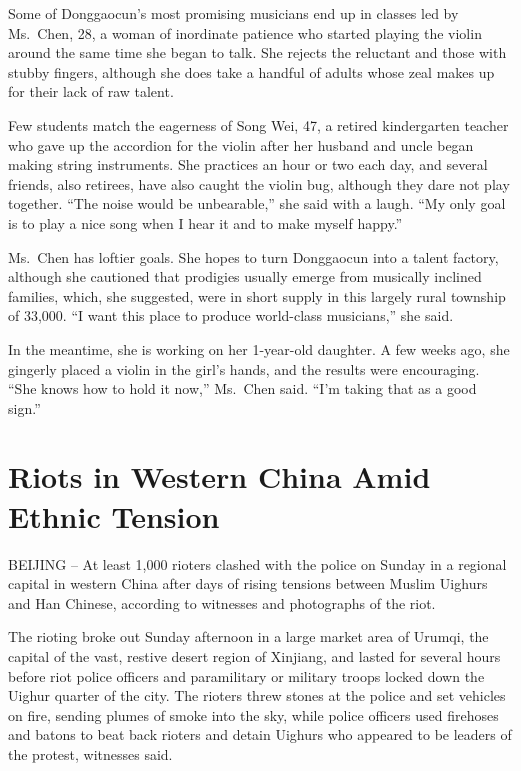 ﻿\documentclass[12pt]{article}
\begin{document}
Some of Donggaocun's most promising musicians end up in classes led by Ms.~Chen, 28, a woman of
inordinate patience who started playing the violin around the same time she began to talk. She
rejects the reluctant and those with stubby fingers, although she does take a handful of adults
whose zeal makes up for their lack of raw talent.

Few students match the eagerness of Song Wei, 47, a retired kindergarten teacher who gave up the
accordion for the violin after her husband and uncle began making string instruments. She practices
an hour or two each day, and several friends, also retirees, have also caught the violin bug,
although they dare not play together. ``The noise would be unbearable,'' she said with a laugh. ``My
only goal is to play a nice song when I hear it and to make myself happy.''

Ms.~Chen has loftier goals. She hopes to turn Donggaocun into a talent factory, although she
cautioned that prodigies usually emerge from musically inclined families, which, she suggested, were
in short supply in this largely rural township of 33,000. ``I want this place to produce world-class
musicians,'' she said.

In the meantime, she is working on her 1-year-old daughter. A few weeks ago, she gingerly placed a
violin in the girl's hands, and the results were encouraging. ``She knows how to hold it now,''
Ms.~Chen said. ``I'm taking that as a good sign.''

\section{Riots in Western China Amid Ethnic Tension}

BEIJING -- At least 1,000 rioters clashed with the police on Sunday in a regional capital in western
China after days of rising tensions between Muslim Uighurs and Han Chinese, according to witnesses
and photographs of the riot.

The rioting broke out Sunday afternoon in a large market area of Urumqi, the capital of the vast,
restive desert region of Xinjiang, and lasted for several hours before riot police officers and
paramilitary or military troops locked down the Uighur quarter of the city. The rioters threw stones
at the police and set vehicles on fire, sending plumes of smoke into the sky, while police officers
used firehoses and batons to beat back rioters and detain Uighurs who appeared to be leaders of the
protest, witnesses said.
\end{document}

